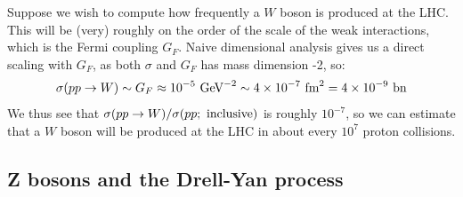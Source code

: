 \documentclass[11pt, oneside]{article}   	%
\theoremstyle{definition}
\numberwithin{equation}{subsection}		%
\begin{document}
Suppose we wish to compute how frequently a $W$ boson is produced at the LHC. This will be (very) roughly on the order of the scale of the 
weak interactions, which is the Fermi coupling $G_F$. Naive dimensional analysis gives us a direct scaling with $G_F$, as both $\sigma$ and 
$G_F$ has mass dimension -2, so:
\begin{equation}
	\sigma(pp\rightarrow W)\sim G_F\approx 10^{-5}\textnormal{ GeV}^{-2}\sim 4\times 10^{-7}\textnormal{ fm}^2 = 4\times 10^{-9}\textnormal{ bn} \nonumber
\end{equation}
We thus see that $\sigma(pp\rightarrow W) / \sigma(pp; \textnormal{ inclusive})$ is roughly $10^{-7}$, so we can estimate that a $W$ boson will 
be produced at the LHC in about every $10^7$ proton collisions. 

\subsection{Z bosons and the Drell-Yan process}
\end{document}
